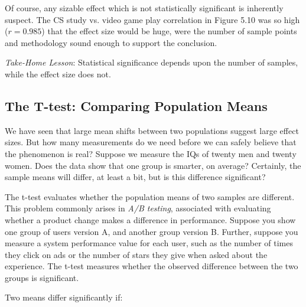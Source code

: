 \documentclass[10pt]{article}
\begin{document}
Of course, any sizable effect which is not statistically significant is inherently suspect. The CS study vs. video game play correlation in Figure 5.10 was so high ($r=0.985$) that the effect size would be huge, were the number of sample points and methodology sound enough to support the conclusion.

\textit{Take-Home Lesson}: Statistical significance depends upon the number of samples, while the effect size does not.

\subsection{The T-test: Comparing Population Means}
We have seen that large mean shifts between two populations suggest large effect sizes. But how many measurements do we need before we can safely believe that the phenomenon is real? Suppose we measure the IQs of twenty men and twenty women. Does the data show that one group is smarter, on average? Certainly, the sample means will differ, at least a bit, but is this difference significant?

The t-test evaluates whether the population means of two samples are different. This problem commonly arises in \textit{A/B testing}, associated with evaluating whether a product change makes a difference in performance. Suppose you show one group of users version A, and another group version B. Further, suppose you measure a system performance value for each user, such as the number of times they click on ads or the number of stars they give when asked about the experience. The t-test measures whether the observed difference between the two groups is significant.

Two means differ significantly if:
\end{document}

